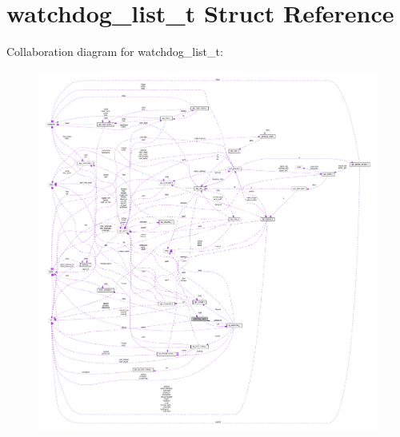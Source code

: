 \hypertarget{structwatchdog__list__t}{}\section{watchdog\+\_\+list\+\_\+t Struct Reference}
\label{structwatchdog__list__t}


Collaboration diagram for watchdog\+\_\+list\+\_\+t\+:
\nopagebreak
\begin{figure}[H]
\begin{center}
\leavevmode
\includegraphics[width=350pt]{structwatchdog__list__t__coll__graph}
\end{center}
\end{figure}
